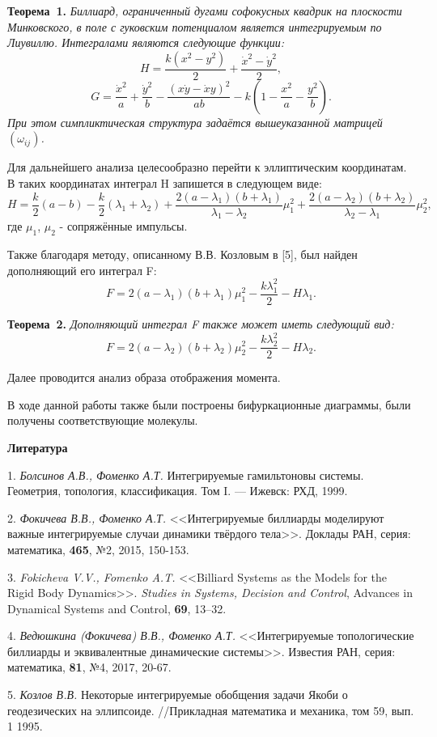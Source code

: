\textbf{Теорема~1.} {\it Биллиард, ограниченный дугами софокусных квадрик на плоскости Минковского, в поле с гуковским потенциалом является интегрируемым по Лиувиллю. Интегралами являются следующие функции:
$$H=\frac{k(x^2-y^2)}{2}+\frac{{\dot{x}}^2-{\dot{y}}^2}{2},$$
$$G=\frac{{\dot{x}}^2}{a}+\frac{{\dot{y}}^2}{b}-\frac{{(x\dot{y}-\dot{x}y)}^2}{ab}-k(1-\frac{x^2}{a}-\frac{y^2}{b}).$$ При этом симпликтическая структура задаётся вышеуказанной матрицей $(\omega_{ij})$.}

Для дальнейшего анализа целесообразно перейти к эллиптическим координатам. В таких координатах интеграл H запишется в следующем виде:
$$H=\frac{k}{2}(a-b)-\frac{k}{2}(\lambda_1+\lambda_2)+\frac{2(a-\lambda_1)(b+\lambda_1)}{\lambda_1-\lambda_2}\mu_1^2+\frac{2(a-\lambda_2)(b+\lambda_2)}{\lambda_2-\lambda_1}\mu_2^2,$$
где $\mu_1$, $\mu_2$ - сопряжённые импульсы.

Также благодаря методу, описанному В.В. Козловым в [5], был найден дополняющий его интеграл F:
$$F=2(a-\lambda_1)(b+\lambda_1)\mu_1^2-\frac{k\lambda_1^2}{2}-H\lambda_1.$$

\textbf{Теорема~2.} {\it Дополняющий интеграл F также может иметь следующий вид:
$$F=2(a-\lambda_2)(b+\lambda_2)\mu_2^2-\frac{k\lambda_2^2}{2}-H\lambda_2.$$}

Далее проводится анализ образа отображения момента.

В ходе данной работы также были построены бифуркационные диаграммы, были получены соответствующие молекулы.

\smallskip \centerline {\bf Литература} \nopagebreak

1. {\it Болсинов А.В., Фоменко А.Т.} Интегрируемые гамильтоновы системы. Геометрия, топология, классификация. Том I. — Ижевск: РХД, 1999.

2. {\it Фокичева В.В., Фоменко А.Т.} <<Интегрируемые биллиарды моделируют важные интегрируемые случаи динамики твёрдого тела>>. Доклады РАН, серия: математика, {\bf 465}, №2, 2015, 150-153.

3. {\it Fokicheva V.V., Fomenko A.T.} <<Billiard Systems as the Models for the Rigid
Body Dynamics>>. {\it Studies in Systems, Decision and Control}, Advances in Dynamical
Systems and Control, {\bf 69}, 13–32.

4. {\it Ведюшкина (Фокичева) В.В., Фоменко А.Т.} <<Интегрируемые топологические биллиарды и эквивалентные динамические системы>>. Известия РАН, серия: математика, {\bf 81}, №4, 2017, 20-67.

5. {\it Козлов В.В.} Некоторые интегрируемые обобщения задачи Якоби о геодезических на эллипсоиде. //Прикладная математика и механика, том 59, вып. 1 1995.
